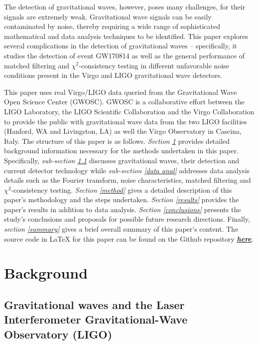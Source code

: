 \documentclass[preprint,
letterpaper,
 amsmath,amssymb,
 aps,
]{revtex4-2}
\begin{document}
The detection of gravitational waves, however, poses many challenges, for their signals are extremely weak. Gravitational wave signals can be easily contaminated by noise, thereby requiring a wide range of sophisticated mathematical and data analysis techniques to be identified. This paper explores several complications in the detection of gravitational waves – specifically, it studies the detection of event GW170814 as well as the general performance of matched filtering and $\chi^2$-consistency testing in different unfavorable noise conditions present in the Virgo and LIGO gravitational wave detectors.

This paper uses real Virgo/LIGO data queried from the Gravitational Wave Open Science Center (GWOSC). GWOSC is a collaborative effort between the LIGO Laboratory, the LIGO Scientific Collaboration and the Virgo Collaboration to provide the public with gravitational wave data from the two LIGO facilities (Hanford, WA and Livingston, LA) as well the Virgo Observatory in Cascina, Italy. The structure of this paper is as follows. \textit{Section \ref{background}} provides detailed background information necessary for the methods undertaken in this paper. Specifically, \textit{sub-section \ref{gw and ligo}} discusses gravitational waves, their detection and current detector technology while \textit{sub-section \ref{data anal}} addresses data analysis details such as  the Fourier transform, noise characteristics, matched filtering and $\chi^2$-consistency testing. \textit{Section \ref{method}} gives a detailed description of this paper's methodology and the steps undertaken. \textit{Section \ref{results}} provides the paper's results in addition to data analysis. \textit{Section \ref{conclusions}} presents the study's conclusions and proposals for possible future research directions. Finally, \textit{section \ref{summary}} gives a brief overall summary of this paper's content. The source code in LaTeX for this paper can be found on the Github repository \href{https://github.com/VinhNguyen313/LIGO-and-Gravitational-Waves-Project}{\textbf{\textit{here}}}.

\section{Background} \label{background}
\subsection{Gravitational waves and the Laser Interferometer Gravitational-Wave Observatory (LIGO)} \label{gw and ligo}
\end{document}
